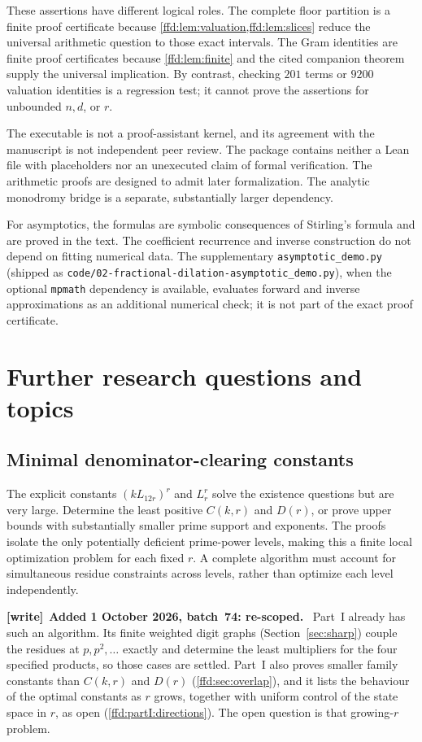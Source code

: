 \documentclass[11pt]{article}
\theoremstyle{definition}
\theoremstyle{remark}
\newenvironment{writenote}[1][]{\par\smallskip\begingroup\small
 \noindent\textbf{[write]}\if\relax\detokenize{#1}\relax\else~\textbf{#1.}\fi\ }%
 {\par\endgroup\smallskip}
\begin{document}
These assertions have different logical roles. The complete floor partition
is a finite proof certificate because \cref{ffd:lem:valuation,ffd:lem:slices} reduce
the universal arithmetic question to those exact intervals. The Gram
identities are finite proof certificates because \cref{ffd:lem:finite} and the
cited companion theorem supply the universal implication. By contrast,
checking $201$ terms or $9200$ valuation identities is a regression test;
it cannot prove the assertions for unbounded $n,d$, or $r$.

The executable is not a proof-assistant kernel, and its agreement with the
manuscript is not independent peer review. The package contains neither a
Lean file with placeholders nor an unexecuted claim of formal verification.
The arithmetic proofs are designed to admit later formalization. The analytic
monodromy bridge is a separate, substantially larger dependency.

For asymptotics, the formulas are symbolic consequences of Stirling's formula
and are proved in the text. The coefficient recurrence and inverse construction
do not depend on fitting numerical data. The supplementary
\texttt{asymptotic\_demo.py} (shipped as
\nolinkurl{code/02-fractional-dilation-asymptotic_demo.py}), when the optional \texttt{mpmath} dependency is
available, evaluates forward and inverse approximations as an additional
numerical check; it is not part of the exact proof certificate.

\section{Further research questions and topics}\label{ffd:sec:further}
\subsection{Minimal denominator-clearing constants}
The explicit constants $(kL_{12r})^r$ and $L_r^r$ solve the existence questions
but are very large. Determine the least positive $C(k,r)$ and $D(r)$, or
prove upper bounds with substantially smaller prime support and exponents.
The proofs isolate the only potentially deficient prime-power levels, making
this a finite local optimization problem for each fixed $r$. A complete
algorithm must account for simultaneous residue constraints across levels,
rather than optimize each level independently.

\begin{writenote}[Added 1 October 2026, batch~74: re-scoped]
Part~I already has such an algorithm. Its finite weighted digit graphs
(Section~\ref{sec:sharp}) couple the residues at $p,p^2,\dots$ exactly and
determine the least multipliers for the four specified products, so those
cases are settled. Part~I also proves smaller family constants than $C(k,r)$
and $D(r)$ (\cref{ffd:sec:overlap}), and it lists the behaviour of the
optimal constants as $r$ grows, together with uniform control of the
state space in $r$, as open (\cref{ffd:partI:directions}).
The open question is that growing-$r$ problem.
\end{writenote}
\end{document}
